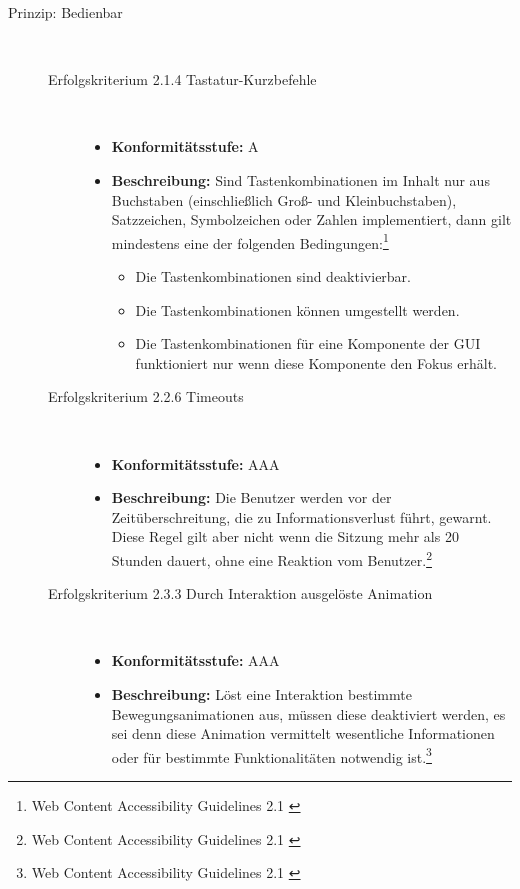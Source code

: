 \begin{description}
	\item[Prinzip: Bedienbar]\hfill \\
	\begin{description}
		\item [Erfolgskriterium 2.1.4 Tastatur-Kurzbefehle]\hfill \\
		\begin{itemize}
			\item \textbf{Konformitätsstufe:} A
			\item \textbf{Beschreibung:} Sind Tastenkombinationen im Inhalt nur aus Buchstaben (einschließlich Groß- und Kleinbuchstaben), Satzzeichen, Symbolzeichen oder Zahlen 
			implementiert, dann gilt mindestens eine der folgenden Bedingungen:\footnote{Web Content Accessibility Guidelines 2.1 \cite{WCAG2.1}}
			\begin{itemize}
				\item Die Tastenkombinationen sind deaktivierbar.
				\item Die Tastenkombinationen können umgestellt werden.
				\item Die Tastenkombinationen für eine Komponente der \ac{GUI} funktioniert nur wenn diese Komponente den Fokus erhält.
			\end{itemize}
		\end{itemize}
		
		\item [Erfolgskriterium 2.2.6 Timeouts]\hfill \\
		\begin{itemize}
			\item \textbf{Konformitätsstufe:} AAA
			\item \textbf{Beschreibung:} Die Benutzer werden vor der Zeitüberschreitung, die zu Informationsverlust führt, gewarnt. Diese Regel gilt aber nicht wenn die Sitzung mehr 
			als 20 Stunden dauert, ohne eine Reaktion vom Benutzer.\footnote{Web Content Accessibility Guidelines 2.1 \cite{WCAG2.1}}
		\end{itemize}
		
		\item [Erfolgskriterium 2.3.3 Durch Interaktion ausgelöste Animation]\hfill \\
		\begin{itemize}
			\item \textbf{Konformitätsstufe:} AAA
			\item \textbf{Beschreibung:} Löst eine Interaktion bestimmte Bewegungsanimationen aus, müssen diese deaktiviert werden, es sei denn diese Animation vermittelt 
			wesentliche Informationen oder für bestimmte Funktionalitäten notwendig ist.\footnote{Web Content Accessibility Guidelines 2.1 \cite{WCAG2.1}}
		\end{itemize}
		

\end{description}
\end{description}
